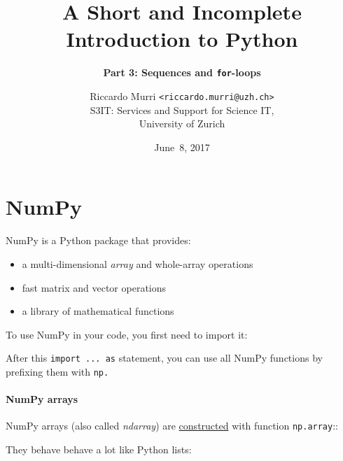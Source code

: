 \documentclass[english,serif,mathserif,xcolor=pdftex,dvipsnames,table]{beamer}
\title[3. Sequences and loops]{%
  A Short and Incomplete Introduction to Python
}
\subtitle{\bfseries Part 3: Sequences and \texttt{for}-loops}
\author[R.~Murri]{%
  Riccardo Murri \texttt{<riccardo.murri@uzh.ch>}
  \\
  S3IT: Services and Support for Science IT,
  \\
  University of Zurich
}
\date{June~8, 2017}
\begin{document}
\maketitle


\part{NumPy}

NumPy is a Python package that provides:

\begin{itemize}
\tightlist
\item
  a multi-dimensional \emph{array} and whole-array operations
\item
  fast matrix and vector operations
\item
  a library of mathematical functions
\end{itemize}

To use NumPy in your code, you first need to import it:

\begin{Shaded}
\begin{Highlighting}[]
  
\end{Highlighting}
\end{Shaded}

After this \texttt{import\ ...\ as} statement, you can use all NumPy
functions by prefixing them with \texttt{np.}

\subsection{NumPy arrays}\label{numpy-arrays}

NumPy arrays (also called \emph{ndarray}) are
\href{https://docs.scipy.org/doc/numpy/user/basics.creation.html}{constructed}
with function \texttt{np.array}::

\begin{Shaded}
\begin{Highlighting}[]
\OperatorTok{=} \NormalTok{np.array([}\NormalTok{, }\NormalTok{, }\NormalTok{, }\NormalTok{, }\NormalTok{])}
\end{Highlighting}
\end{Shaded}

They behave behave a lot like Python lists:

\begin{Shaded}
\begin{Highlighting}[]
\NormalTok{a[}\NormalTok{]}
\end{Highlighting}
\end{Shaded}
\end{document}
